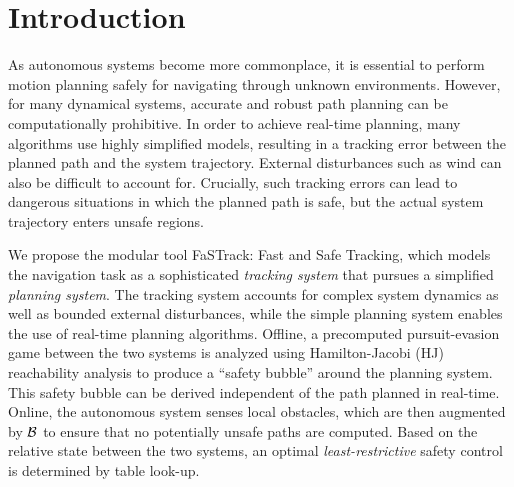 \section{Introduction}
 As autonomous systems become more commonplace, it is essential to perform motion planning safely for navigating through unknown environments. However, for many dynamical systems, accurate and robust path planning can be computationally prohibitive. In order to achieve real-time planning, many algorithms use highly simplified models, resulting in a tracking error between the planned path and the system trajectory. External disturbances such as wind can also be difficult to account for. Crucially, such tracking errors can lead to dangerous situations in which the planned path is safe, but the actual system trajectory enters unsafe regions.
 


We propose the modular tool FaSTrack: Fast and Safe Tracking, which models the navigation task as a sophisticated \textit{tracking system} that pursues a simplified \textit{planning system}. The tracking system accounts for complex system dynamics as well as bounded external disturbances, while the simple planning system enables the use of real-time planning algorithms. Offline, a precomputed pursuit-evasion game between the two systems is analyzed using Hamilton-Jacobi (HJ) reachability analysis to produce a ``safety bubble'' around the planning system. This safety bubble can be derived independent of the path planned in real-time. Online, the autonomous system senses local obstacles, which are then augmented by $\mathcal B$ to ensure that no potentially unsafe paths are computed. Based on the relative state between the two systems, an optimal \textit{least-restrictive} safety control is determined by table look-up. %

